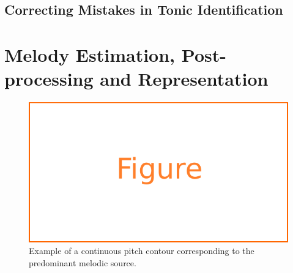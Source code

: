 {%
%
%
%



\subsection{Correcting Mistakes in Tonic Identification}
\label{sec:pre_processing_tonic_identification_correcting_mistakes}









\section{Melody Estimation, Post-processing and Representation}
\label{sec:data_preprocessing_melody_estimation}

\begin{figure}
	\begin{center}
		\includegraphics[width=\figSizeEighty]{ch05_preprocessing/figures/figure_todo.pdf}
	\end{center}
	\caption{Example of a continuous pitch contour corresponding to the predominant melodic source.}
	\label{fig:predominant_melodic_fragment}
\end{figure}


}
